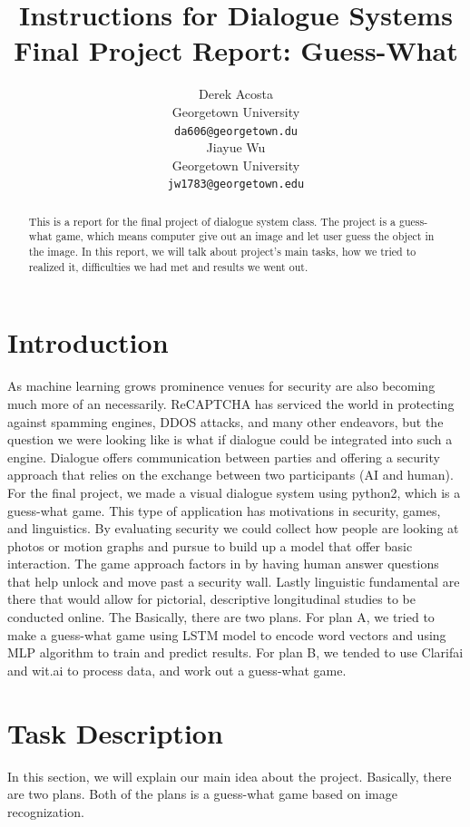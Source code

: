 \documentclass[11pt,a4paper]{article}
\title{Instructions for Dialogue Systems Final Project Report: Guess-What}
\author{Derek Acosta\\
  Georgetown University \\
  {\tt da606@georgetown.du} \\
Jiayue Wu \\
  Georgetown University \\
  {\tt jw1783@georgetown.edu} \\}
\date{}
\begin{document}
\maketitle
\begin{abstract}
  This is a report for the final project of dialogue system class. The project is a guess-what game, which means computer give out an image and let user guess the object in the image. In this report, we will talk about project's main tasks, how we tried to realized it, difficulties we had met and results we went out.
\end{abstract}

\section{Introduction}
As machine learning grows prominence venues for security are also becoming much more of an necessarily. ReCAPTCHA has serviced the world in protecting against spamming engines, DDOS attacks, and many other endeavors, but the question we were looking like is what if dialogue could be integrated into such a engine. Dialogue offers communication between parties and offering a security approach that relies on the exchange between two participants (AI and human). For the final project, we made a visual dialogue system using python2, which is a guess-what game. This type of application has motivations in security, games, and linguistics. By evaluating security we could collect how people are looking at photos or motion graphs and pursue to build up a model that offer basic interaction. The game approach factors in by having human answer questions that help unlock and move past a security wall. Lastly linguistic  fundamental are there that would allow for pictorial, descriptive longitudinal studies to be conducted online. The Basically, there are two plans. For plan A, we tried to make a guess-what game using LSTM model to encode word vectors and using MLP algorithm to train and predict results. For plan B, we tended to use Clarifai and wit.ai to process data, and work out a guess-what game.

\section{Task Description}

In this section, we will explain our main idea about the project. Basically, there are two plans. Both of the plans is a guess-what game based on image recognization.
\end{document}
